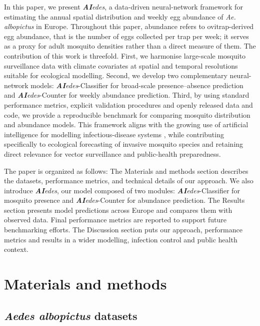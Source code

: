 \documentclass[preprint,12pt]{elsarticle}
\begin{document}
In this paper, we present \textit{\textbf{AI}edes}, a data-driven neural-network framework for estimating the annual spatial distribution and weekly egg abundance of \emph{Ae. albopictus} in Europe. Throughout this paper, abundance refers to ovitrap-derived egg abundance, that is the number of eggs collected per trap per week; it serves as a proxy for adult mosquito densities rather than a direct measure of them. The contribution of this work is threefold. First, we harmonise large-scale mosquito surveillance data with climate covariates at spatial and temporal resolutions suitable for ecological modelling. Second, we develop two complementary neural-network models: \textit{\textbf{AI}edes}-Classifier for broad-scale presence--absence prediction and \textit{\textbf{AI}edes}-Counter for weekly abundance prediction. Third, by using standard performance metrics, explicit validation procedures and openly released data and code, we provide a reproducible benchmark for comparing mosquito distribution and abundance models. This framework aligns with the growing use of artificial intelligence for modelling infectious-disease systems \cite{kraemer2025}, while contributing specifically to ecological forecasting of invasive mosquito species and retaining direct relevance for vector surveillance and public-health preparedness.

The paper is organized as follows: The Materials and methods section describes the datasets, performance metrics, and technical details of our approach. We also introduce \textit{\textbf{AI}edes}, our model composed of two modules: \textit{\textbf{AI}edes}-Classifier for mosquito presence and \textit{\textbf{AI}edes}-Counter for abundance prediction. The Results section presents model predictions across Europe and compares them with observed data. Final performance metrics are reported to support future benchmarking efforts. The Discussion section puts our approach, performance metrics and results in a wider modelling, infection control and public health context.



\section{Materials and methods}


\subsection{\textit{Aedes albopictus} datasets}
\end{document}

